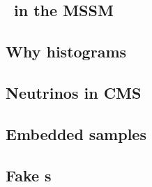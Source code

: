 \subsection*{\HAtoTauTau\ in the MSSM}


\subsection*{Why histograms}


\subsection*{Neutrinos in CMS}


%

\subsection*{Embedded samples}


\subsection*{Fake \tauh s}


